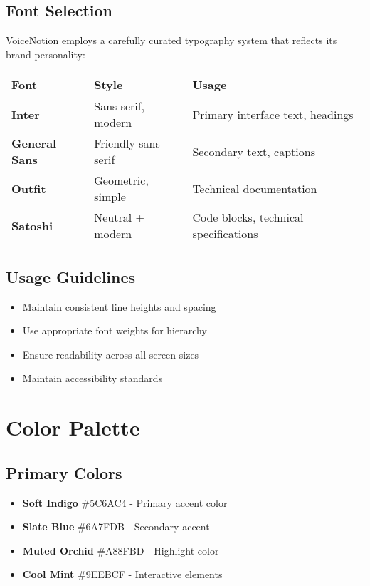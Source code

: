 \subsection{Font Selection}
VoiceNotion employs a carefully curated typography system that reflects its brand personality:
\begin{tabular}{|l|l|l|}
\hline
\textbf{Font} & \textbf{Style} & \textbf{Usage} \\
\hline
\textbf{Inter} & Sans-serif, modern & Primary interface text, headings \\
\hline
\textbf{General Sans} & Friendly sans-serif & Secondary text, captions \\
\hline
\textbf{Outfit} & Geometric, simple & Technical documentation \\
\hline
\textbf{Satoshi} & Neutral + modern & Code blocks, technical specifications \\
\hline
\end{tabular}

\subsection{Usage Guidelines}
\begin{itemize}
    \item Maintain consistent line heights and spacing
    \item Use appropriate font weights for hierarchy
    \item Ensure readability across all screen sizes
    \item Maintain accessibility standards
\end{itemize}

\section{Color Palette}
\subsection{Primary Colors}
\begin{itemize}
    \item \textbf{Soft Indigo} \#5C6AC4 - Primary accent color
    \item \textbf{Slate Blue} \#6A7FDB - Secondary accent
    \item \textbf{Muted Orchid} \#A88FBD - Highlight color
    \item \textbf{Cool Mint} \#9EEBCF - Interactive elements
\end{itemize}


